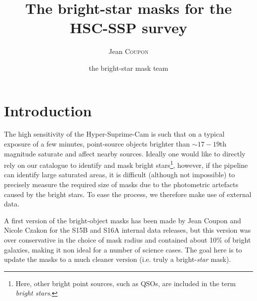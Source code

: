 \documentclass[]{pasj01}
\begin{document}
 
\Received{}%
\Accepted{}%

\title{The bright-star masks for the HSC-SSP survey}

\author{Jean \textsc{Coupon}%
}

\author{the bright-star mask team\textsc{}}


\maketitle

\begin{abstract}
\end{abstract}


\section{Introduction}


The high sensitivity of the Hyper-Suprime-Cam is such that on a typical exposure of a few minutes, point-source objects brighter than $\sim17-19$th magnitude saturate and affect nearby sources. Ideally one would like to directly rely on our catalogue to identify and mask bright stars\footnote{Here, other bright point sources, such as QSOs, are included in the term \emph{bright stars}.}, however, if the pipeline can identify large saturated areas, it is difficult (although not impossible) to precisely measure the required size of masks due to the photometric artefacts caused by the bright stars.  To ease the process, we therefore make use of external data.

A first version of the bright-object masks has been made by Jean Coupon and Nicole Czakon for the S15B and S16A internal data releases, but this version was over conservative in the choice of mask radius and contained about 10\% of bright galaxies, making it non ideal for a number of science cases. The goal here is to update the masks to a much cleaner version (i.e. truly a bright-\emph{star} mask).
\end{document}
